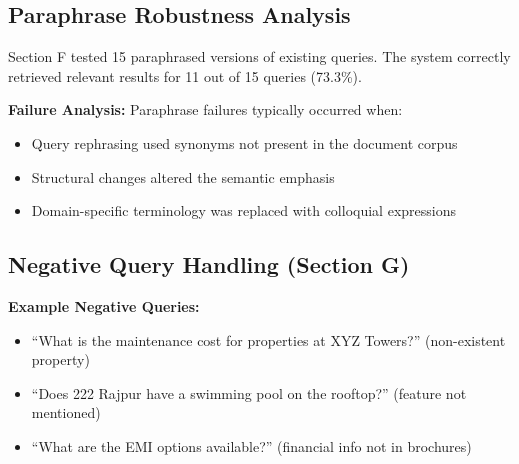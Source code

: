 \documentclass[11pt,a4paper]{article}
\begin{document}
\subsection{Paraphrase Robustness Analysis}

Section F tested 15 paraphrased versions of existing queries. The system correctly retrieved relevant results for 11 out of 15 queries (73.3\%).

\textbf{Failure Analysis:} Paraphrase failures typically occurred when:
\begin{itemize}
    \item Query rephrasing used synonyms not present in the document corpus
    \item Structural changes altered the semantic emphasis
    \item Domain-specific terminology was replaced with colloquial expressions
\end{itemize}

\subsection{Negative Query Handling (Section G)}

\begin{table}[H]
\centering
{}
\end{table}

\textbf{Example Negative Queries:}
\begin{itemize}
    \item ``What is the maintenance cost for properties at XYZ Towers?'' (non-existent property)
    \item ``Does 222 Rajpur have a swimming pool on the rooftop?'' (feature not mentioned)
    \item ``What are the EMI options available?'' (financial info not in brochures)
\end{itemize}
\end{document}
